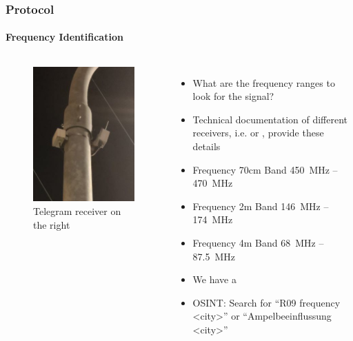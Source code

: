 \begin{frame}
\frametitle{Protocol}
\framesubtitle{Frequency Identification}
\begin{columns}
\centering
\begin{figure}
	\centering
	\includegraphics[width=\textwidth]{figs/lsa-antenna.png}
	\caption{Telegram receiver on the right}
\end{figure}
\begin{itemize}
		\item What are the frequency ranges to look for the signal?
		\item Technical documentation of different receivers, i.e.  or , provide these details
		\item Frequency 70cm Band \SI{450}{\MHz} -- \SI{470}{\MHz}		
		\item Frequency 2m Band \SI{146}{\MHz} -- \SI{174}{\MHz}
		\item Frequency 4m Band \SI{68}{\MHz} -- \SI{87.5}{\MHz}
		\item We have a 
		\item OSINT: Search for ``R09 frequency <city>'' or ``Ampelbeeinflussung <city>''
\end{itemize}
\end{columns}
\end{frame}

